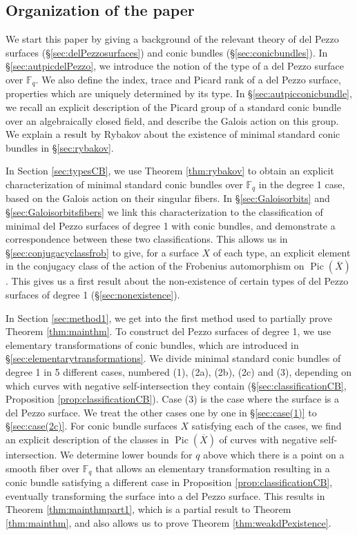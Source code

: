 \documentclass[a4paper, 11pt, reqno]{amsart}
\numberwithin{equation}{section} \numberwithin{figure}{section}
\DeclareMathOperator{\Pic}{Pic}
\def \F {{\mathbb F}}
\theoremstyle{definition}
\numberwithin{lemma}{section}
\begin{document}
\subsection{Organization of the paper}

We start this paper by giving a background of the relevant theory of del Pezzo surfaces (\S\ref{sec:delPezzosurfaces}) and conic bundles (\S\ref{sec:conicbundles}). In \S\ref{sec:autpicdelPezzo}, we introduce the notion of the type of a del Pezzo surface over $\F_q$. We also define the index, trace and Picard rank of a del Pezzo surface, properties which are uniquely determined by its type. In \S\ref{sec:autpicconicbundle}, we recall an explicit description of the Picard group of a standard conic bundle over an algebraically closed field, and describe the Galois action on this group. We explain a result by Rybakov \cite{rybakov} about the existence of minimal standard conic bundles in \S\ref{sec:rybakov}.

In Section \ref{sec:typesCB}, we use Theorem \ref{thm:rybakov} to obtain an explicit characterization of minimal standard conic bundles over $\F_q$ in the degree 1 case, based on the Galois action on their singular fibers. In \S\ref{sec:Galoisorbits} and \S\ref{sec:Galoisorbitsfibers} we link this characterization to the classification of minimal del Pezzo surfaces of degree 1 with conic bundles, and demonstrate a correspondence between these two classifications. This allows us in \S\ref{sec:conjugacyclassfrob} to give, for a surface $X$ of each type, an explicit element in the conjugacy class of the action of the Frobenius automorphism on $\Pic(\overline{X})$. This gives us a first result about the non-existence of certain types of del Pezzo surfaces of degree 1 (\S\ref{sec:nonexistence}). 

In Section \ref{sec:method1}, we get into the first method used to partially prove Theorem \ref{thm:mainthm}. To construct del Pezzo surfaces of degree 1, we use elementary transformations of conic bundles, which are introduced in \S\ref{sec:elementarytransformations}. We divide minimal standard conic bundles of degree 1 in 5 different cases, numbered (1), (2a), (2b), (2c) and (3), depending on which curves with negative self-intersection they contain (\S\ref{sec:classificationCB}, Proposition \ref{prop:classificationCB}). Case (3) is the case where the surface is a del Pezzo surface. We treat the other cases one by one in \S\ref{sec:case(1)} to \S\ref{sec:case(2c)}. For conic bundle surfaces $X$ satisfying each of the cases, we find an explicit description of the classes in $\Pic(\overline{X})$ of curves with negative self-intersection. We determine lower bounds for $q$ above which there is a point on a smooth fiber over $\F_q$ that allows an elementary transformation resulting in a conic bundle satisfying a different case in Proposition \ref{prop:classificationCB}, eventually transforming the surface into a del Pezzo surface. This results in Theorem \ref{thm:mainthmpart1}, which is a partial result to Theorem \ref{thm:mainthm}, and also allows us to prove Theorem \ref{thm:weakdPexistence}.
\end{document}
